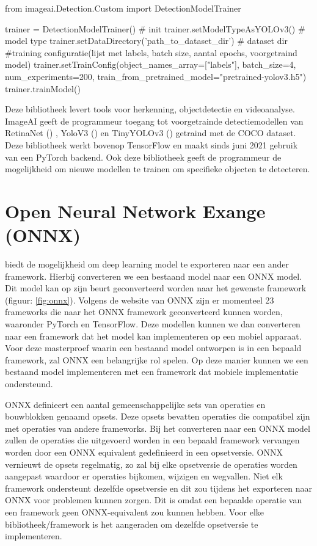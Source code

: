 \begin{python}
from imageai.Detection.Custom import DetectionModelTrainer

trainer = DetectionModelTrainer() # init
trainer.setModelTypeAsYOLOv3()	# model type
trainer.setDataDirectory('path_to_dataset_dir') # dataset dir
#training configuratie(lijst met labels, batch size, aantal epochs, voorgetraind model)
trainer.setTrainConfig(object_names_array=["labels"], batch_size=4, num_experiments=200, train_from_pretrained_model="pretrained-yolov3.h5")
trainer.trainModel()
\end{python}

Deze bibliotheek levert tools voor herkenning, objectdetectie en videoanalyse.
ImageAI geeft de programmeur toegang tot voorgetrainde detectiemodellen van RetinaNet (\cite{lin_focal_2018}) , YoloV3 (\cite{redmon_yolov3_2018}) en TinyYOLOv3 (\cite{Gai_TinyV3_2021}) getraind met de COCO dataset.
Deze bibliotheek werkt bovenop TensorFlow en maakt sinds juni 2021 gebruik van een PyTorch backend.
Ook deze bibliotheek geeft de programmeur de mogelijkheid om nieuwe modellen te trainen om specifieke objecten te detecteren.

\section{Open Neural Network Exange (ONNX)}
\cite{onnx_onnx_2017} biedt de mogelijkheid om deep learning model te exporteren naar een ander framework.
Hierbij converteren we een bestaand model naar een ONNX model.
Dit model kan op zijn beurt geconverteerd worden naar het gewenste framework (figuur: \ref{fig:onnx}).
Volgens de website van ONNX zijn er momenteel 23 frameworks die naar het ONNX framework geconverteerd kunnen worden, waaronder PyTorch en TensorFlow.
Deze modellen kunnen we dan converteren naar een framework dat het model kan implementeren op een mobiel apparaat.
Voor deze masterproef waarin een bestaand model ontworpen is in een bepaald framework, zal ONNX een belangrijke rol spelen.
Op deze manier kunnen we een bestaand model implementeren met een framework dat mobiele implementatie ondersteund.

ONNX definieert een aantal gemeenschappelijke sets van operaties en bouwblokken genaamd opsets.
Deze opsets bevatten operaties die compatibel zijn met operaties van andere frameworks.
Bij het converteren naar een ONNX model zullen de operaties die uitgevoerd worden in een bepaald framework vervangen worden door een ONNX equivalent gedefinieerd in een opsetversie.
ONNX vernieuwt de opsets regelmatig, zo zal bij elke opsetversie de operaties worden aangepast waardoor er operaties bijkomen, wijzigen en wegvallen.
Niet elk framework ondersteunt dezelfde opsetversie en dit zou tijdens het exporteren naar ONNX voor problemen kunnen zorgen.
Dit is omdat een bepaalde operatie van een framework geen ONNX-equivalent zou kunnen hebben.
Voor elke bibliotheek/framework is het aangeraden om dezelfde opsetversie te implementeren.


